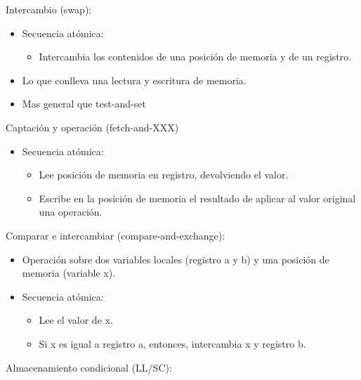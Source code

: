 \documentclass[12pt, twoside, openright]{report} %
\begin{document}
    Intercambio (swap):

    \begin{itemize}
    
    \item
      Secuencia atómica:

      \begin{itemize}
      
      \item
        Intercambia los contenidos de una posición de memoria y de un
        registro.
      \end{itemize}
    \item
      Lo que conlleva una lectura y escritura de memoria.
    \item
      Mas general que test-and-set
    \end{itemize}

    Captación y operación (fetch-and-XXX)

    \begin{itemize}
    
    \item
      Secuencia atómica:

      \begin{itemize}
      
      \item
        Lee posición de memoria en registro, devolviendo el valor.
      \item
        Escribe en la posición de memoria el resultado de aplicar al
        valor original una operación.
      \end{itemize}
    \end{itemize}

    Comparar e intercambiar (compare-and-exchange):

    \begin{itemize}
    
    \item
      Operación sobre dos variables locales (registro a y b) y una
      posición de memoria (variable x).
    \item
      Secuencia atómica:

      \begin{itemize}
      
      \item
        Lee el valor de x.
      \item
        Si x es igual a registro a, entonces, intercambia x y registro
        b.
      \end{itemize}
    \end{itemize}
\pagebreak
    Almacenamiento condicional (LL/SC):
\end{document}
